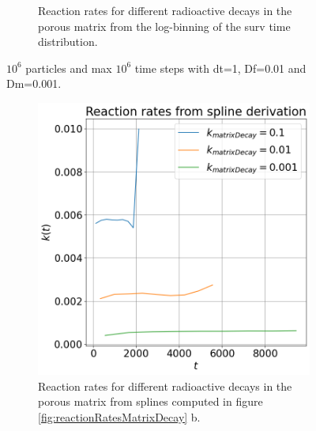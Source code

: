 \documentclass{article}
\begin{document}
\begin{figure}[htbp]
\begin{subfigure}[b]{0.48\textwidth}
        \caption{Reaction rates for different radioactive decays in the porous matrix from the log-binning of the surv time distribution.}
    \end{subfigure}
    \caption{$10^6$ particles and max $10^6$ time steps with dt=1, Df=0.01 and Dm=0.001.}
    \label{fig:reactionRatesMatrixDecayLogBins}
\end{figure}

\begin{figure}[htbp]
    \centering
    \begin{subfigure}[b]{0.48\textwidth}
        \centering
        \includegraphics[width=\textwidth]{images/ratesMatrixDecaySpline.png}
        \caption{Reaction rates for different radioactive decays in the porous matrix from splines computed in figure \ref{fig:reactionRatesMatrixDecay} b.}
    \end{subfigure}
    \hfill
    \begin{subfigure}[b]{0.48\textwidth}
        \centering

\end{subfigure}
\end{figure}
\end{document}

